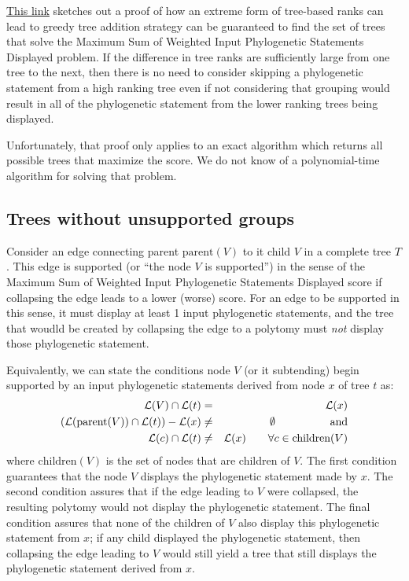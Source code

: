 \documentclass[11pt]{article}
\newcommand{\ps}{phylogenetic statement\xspace}
\newcommand{\pss}{phylogenetic statements\xspace}
\newcommand{\PSs}{Phylogenetic Statements\xspace}
\newcommand{\SWIPSD}{Sum of Weighted Input \PSs Displayed\xspace}
\newcommand{\MSWIPSD}{Maximum \SWIPSD \xspace}
\newcommand{\leafLabels}[1]{\ensuremath{\mathcal{L}(#1)}}
\newcommand{\parent}[1]{\ensuremath{\mbox{parent}(#1)}}
\newcommand{\children}[1]{\ensuremath{\mbox{children}(#1)}}
\begin{document}
\href{https://github.com/OpenTreeOfLife/treemachine/wiki/MaxWeightOfInputTreeEdgesDisplayed}{This link}
    sketches out a proof of how an extreme form of tree-based ranks
    can lead to greedy tree addition strategy can be guaranteed to 
    find the set of trees that solve the \MSWIPSD problem.
If the difference in tree ranks are sufficiently large from one tree to the next,
    then there is no need to consider skipping a \ps from a high ranking tree
    even if not considering that grouping would result in all of the \ps
    from the lower ranking trees being displayed.

Unfortunately, that proof only applies to an exact algorithm which returns
    all possible trees that maximize the score.
We do not know of a polynomial-time algorithm for solving that problem.

\subsection{Trees without unsupported groups}\label{unsupportedTheory}
Consider an edge connecting parent $\parent{V}$ to it child $V$ in a complete tree $T$.
This edge is supported (or ``the node $V$ is supported'') in the sense of the \MSWIPSD score if
    collapsing the edge leads to a lower (worse) score.
For an edge to be supported in this sense, it must display at least 1 input \pss, and
    the tree that woudld be created by collapsing the edge to a polytomy must
    {\em not} display those \ps.

Equivalently, we can state the conditions node $V$ (or it subtending) begin supported
    by an input \pss derived from node $x$ of tree $t$ as:
\begin{eqnarray}
    \leafLabels{V} \cap \leafLabels{t} & = & \leafLabels{x}\\
    \left(\leafLabels{\parent{V}} \cap \leafLabels{t}\right) - \leafLabels{x} & \neq &\emptyset\hskip 5em \mbox{and}\\
    \leafLabels{c} \cap \leafLabels{t} & \neq & \leafLabels{x} \hskip 2em \forall c \in \children{V}
\end{eqnarray}
where $\children{V}$ is the set of nodes that are children of $V$.
The first condition guarantees that the node $V$ displays the \ps made by $x$.
The second condition assures that if the edge leading to $V$ were collapsed, the resulting polytomy would not display the \ps.
The final condition assures that none of the children of $V$ also display this \ps from $x$;
    if any child displayed the \ps, then collapsing the edge leading to $V$ would still
    yield a tree that still displays the \ps derived from $x$.
\end{document}
